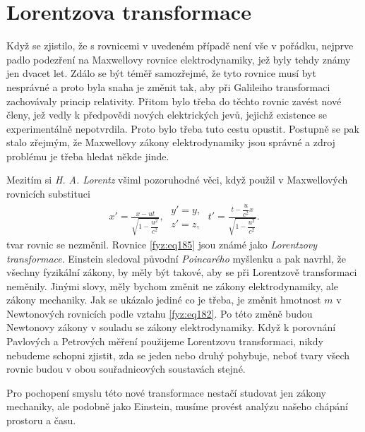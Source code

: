     
  \section{Lorentzova transformace}\label{fyz:IchapXVsecIV}
    Když se zjistilo, že s rovnicemi v uvedeném případě není vše v pořádku, nejprve padlo podezření 
    na Maxwellovy rovnice elektrodynamiky, jež byly tehdy známy jen dvacet let. Zdálo se být téměř 
    samozřejmé, že tyto rovnice musí byt nesprávné a proto byla snaha je změnit tak, aby při 
    Galileiho transformaci zachovávaly princip relativity. Přitom bylo třeba do těchto rovnic 
    zavést nové členy, jež vedly k předpovědi nových elektrických jevů, jejichž existence se 
    experimentálně nepotvrdila. Proto bylo třeba tuto cestu opustit. Postupně se pak stalo zřejmým, 
    že Maxwellovy zákony elektrodynamiky jsou správné a zdroj problému je třeba hledat někde 
    jinde.  
    
    Mezitím si \emph{H. A. Lorentz} všiml pozoruhodné věci, když použil v Maxwellových rovnicích
    substituci
    \begin{gather}\label{fyz:eq185}
      x' = \frac{x - ut}{\sqrt{1-\dfrac{u^2}{c^2}}}, \;
      \begin{array}{c}      
        y' = y, \\ z' = z,                         
      \end{array}\;
      t' = \frac{t-\dfrac{u}{c^2}x}{\sqrt{1-\dfrac{u^2}{c^2}}}. 
    \end{gather} 
    tvar rovnic se nezměnil. Rovnice \ref{fyz:eq185} jsou známé jako \emph{Lorentzovy 
    transformace}. Einstein sledoval původní \emph{Poincarého} myšlenku a pak navrhl, že všechny 
    fyzikální zákony, by měly být takové, aby se při Lorentzově transformaci neměnily. Jinými 
    slovy, měly bychom změnit ne zákony elektrodynamiky, ale zákony mechaniky. Jak se ukázalo 
    jediné co je třeba, je změnit hmotnost \(m\) v Newtonových rovnicích podle vztahu 
    \ref{fyz:eq182}. Po této změně budou Newtonovy zákony v souladu se zákony elektrodynamiky. Když 
    k porovnání Pavlových a Petrových měření použijeme Lorentzovu transformaci, nikdy nebudeme 
    schopni zjistit, zda se jeden nebo druhý pohybuje, neboť tvary všech rovnic budou v obou 
    souřadnicových soustavách stejné. 
    
    Pro pochopení smyslu této nové transformace nestačí studovat jen zákony mechaniky, ale podobně 
    jako Einstein, musíme provést analýzu našeho chápání prostoru a času. 

